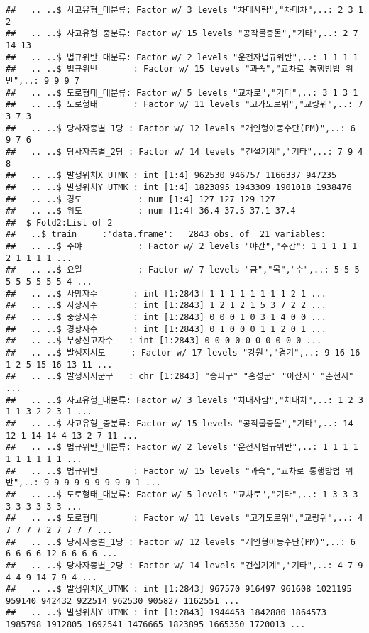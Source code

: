 \documentclass[]{article}
\begin{document}
\begin{verbatim}
##   .. ..$ 사고유형_대분류: Factor w/ 3 levels "차대사람","차대차",..: 2 3 1 2
##   .. ..$ 사고유형_중분류: Factor w/ 15 levels "공작물충돌","기타",..: 2 7 14 13
##   .. ..$ 법규위반_대분류: Factor w/ 2 levels "운전자법규위반",..: 1 1 1 1
##   .. ..$ 법규위반       : Factor w/ 15 levels "과속","교차로 통행방법 위반",..: 9 9 9 7
##   .. ..$ 도로형태_대분류: Factor w/ 5 levels "교차로","기타",..: 3 1 3 1
##   .. ..$ 도로형태       : Factor w/ 11 levels "고가도로위","교량위",..: 7 3 7 3
##   .. ..$ 당사자종별_1당 : Factor w/ 12 levels "개인형이동수단(PM)",..: 6 9 7 6
##   .. ..$ 당사자종별_2당 : Factor w/ 14 levels "건설기계","기타",..: 7 9 4 8
##   .. ..$ 발생위치X_UTMK : int [1:4] 962530 946757 1166337 947235
##   .. ..$ 발생위치Y_UTMK : int [1:4] 1823895 1943309 1901018 1938476
##   .. ..$ 경도           : num [1:4] 127 127 129 127
##   .. ..$ 위도           : num [1:4] 36.4 37.5 37.1 37.4
##  $ Fold2:List of 2
##   ..$ train     :'data.frame':   2843 obs. of  21 variables:
##   .. ..$ 주야           : Factor w/ 2 levels "야간","주간": 1 1 1 1 1 2 1 1 1 1 ...
##   .. ..$ 요일           : Factor w/ 7 levels "금","목","수",..: 5 5 5 5 5 5 5 5 5 4 ...
##   .. ..$ 사망자수       : int [1:2843] 1 1 1 1 1 1 1 1 2 1 ...
##   .. ..$ 사상자수       : int [1:2843] 1 2 1 2 1 5 3 7 2 2 ...
##   .. ..$ 중상자수       : int [1:2843] 0 0 0 1 0 3 1 4 0 0 ...
##   .. ..$ 경상자수       : int [1:2843] 0 1 0 0 0 1 1 2 0 1 ...
##   .. ..$ 부상신고자수   : int [1:2843] 0 0 0 0 0 0 0 0 0 0 ...
##   .. ..$ 발생지시도     : Factor w/ 17 levels "강원","경기",..: 9 16 16 1 2 5 15 16 13 11 ...
##   .. ..$ 발생지시군구   : chr [1:2843] "송파구" "홍성군" "아산시" "춘천시" ...
##   .. ..$ 사고유형_대분류: Factor w/ 3 levels "차대사람","차대차",..: 1 2 3 1 1 3 2 2 3 1 ...
##   .. ..$ 사고유형_중분류: Factor w/ 15 levels "공작물충돌","기타",..: 14 12 1 14 14 4 13 2 7 11 ...
##   .. ..$ 법규위반_대분류: Factor w/ 2 levels "운전자법규위반",..: 1 1 1 1 1 1 1 1 1 1 ...
##   .. ..$ 법규위반       : Factor w/ 15 levels "과속","교차로 통행방법 위반",..: 9 9 9 9 9 9 9 9 9 1 ...
##   .. ..$ 도로형태_대분류: Factor w/ 5 levels "교차로","기타",..: 1 3 3 3 3 3 3 3 3 3 ...
##   .. ..$ 도로형태       : Factor w/ 11 levels "고가도로위","교량위",..: 4 7 7 7 7 2 7 7 7 7 ...
##   .. ..$ 당사자종별_1당 : Factor w/ 12 levels "개인형이동수단(PM)",..: 6 6 6 6 6 12 6 6 6 6 ...
##   .. ..$ 당사자종별_2당 : Factor w/ 14 levels "건설기계","기타",..: 4 7 9 4 4 9 14 7 9 4 ...
##   .. ..$ 발생위치X_UTMK : int [1:2843] 967570 916497 961608 1021195 959140 942432 922514 962530 905827 1162551 ...
##   .. ..$ 발생위치Y_UTMK : int [1:2843] 1944453 1842880 1864573 1985798 1912805 1692541 1476665 1823895 1665350 1720013 ...

\end{verbatim}
\end{document}
